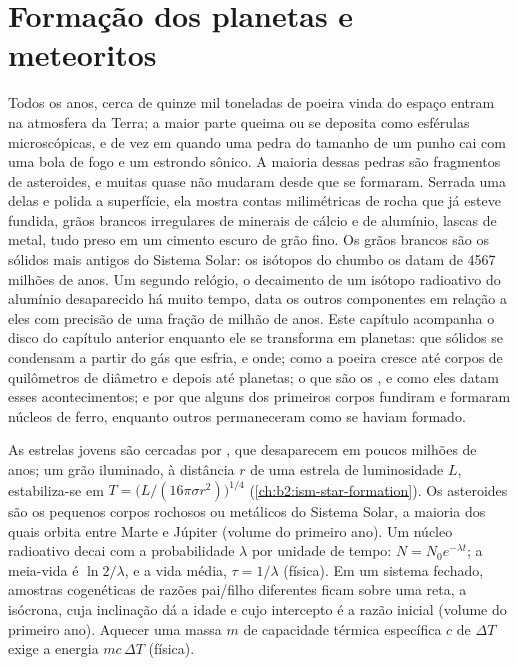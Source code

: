 \chapter{Formação dos planetas e meteoritos}\label{ch:b2:planet-formation-meteorites}

Todos os anos, cerca de quinze mil toneladas de poeira vinda do espaço entram na
atmosfera da Terra; a maior parte queima ou se deposita como esférulas microscópicas, e de
vez em quando uma pedra do tamanho de um punho cai com uma bola de fogo e um estrondo sônico.
A maioria dessas pedras são fragmentos de asteroides, e muitas quase não mudaram
desde que se formaram. Serrada uma delas e polida a superfície, ela mostra contas milimétricas
de rocha que já esteve fundida, grãos brancos irregulares de minerais de cálcio e de alumínio,
lascas de metal, tudo preso em um cimento escuro de grão fino. Os grãos
brancos são os sólidos mais antigos do Sistema Solar: os isótopos do chumbo os datam de
4567 milhões de anos. Um segundo relógio, o decaimento de um isótopo radioativo do
alumínio desaparecido há muito tempo, data os outros componentes em relação a
eles com precisão de uma fração de milhão de anos. Este capítulo acompanha o disco do
capítulo anterior enquanto ele se transforma em planetas: que sólidos se condensam a partir do
gás que esfria, e onde; como a poeira cresce até corpos de quilômetros de diâmetro e depois
até planetas; o que são os , e como eles datam esses acontecimentos; e por que
alguns dos primeiros corpos fundiram e formaram núcleos de ferro, enquanto outros permaneceram como
se haviam formado.

\begin{recall}
As estrelas jovens são cercadas por , que desaparecem em
poucos milhões de anos; um grão iluminado, à distância $r$ de uma estrela de
luminosidade $L$, estabiliza-se em $T = \bigl(L/(16\pi\sigma r^2)\bigr)^{1/4}$
(\cref{ch:b2:ism-star-formation}). Os asteroides são os pequenos corpos rochosos ou metálicos
do Sistema Solar, a maioria dos quais orbita entre Marte e Júpiter (volume do primeiro
ano). Um núcleo radioativo decai com a probabilidade $\lambda$ por unidade de
tempo: $N = N_0 e^{-\lambda t}$; a meia-vida é $\ln 2/\lambda$, e a vida
média, $\tau = 1/\lambda$ (física). Em um sistema fechado, amostras cogenéticas de
razões pai/filho diferentes ficam sobre uma reta, a isócrona, cuja
inclinação dá a idade e cujo intercepto é a razão inicial (volume do primeiro ano).
Aquecer uma massa $m$ de capacidade térmica específica $c$ de $\Delta T$ exige a energia
$mc\,\Delta T$ (física).
\end{recall}

